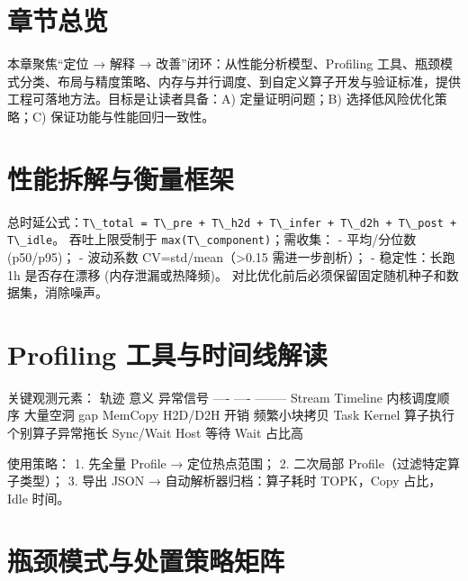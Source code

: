 \section{章节总览}\label{ux7ae0ux8282ux603bux89c8}

本章聚焦``定位 → 解释 → 改善''闭环：从性能分析模型、Profiling
工具、瓶颈模式分类、布局与精度策略、内存与并行调度、到自定义算子开发与验证标准，提供工程可落地方法。目标是让读者具备：A)
定量证明问题；B) 选择低风险优化策略；C) 保证功能与性能回归一致性。

\section{性能拆解与衡量框架}\label{ux6027ux80fdux62c6ux89e3ux4e0eux8861ux91cfux6846ux67b6}

总时延公式：\passthrough{\lstinline!T\_total = T\_pre + T\_h2d + T\_infer + T\_d2h + T\_post + T\_idle!}。
吞吐上限受制于 \passthrough{\lstinline!max(T\_component)!}；需收集： -
平均/分位数 (p50/p95)； - 波动系数 CV=std/mean（\textgreater0.15
需进一步剖析）； - 稳定性：长跑 1h 是否存在漂移 (内存泄漏或热降频)。
对比优化前后必须保留固定随机种子和数据集，消除噪声。

\section{Profiling
工具与时间线解读}\label{profiling-ux5de5ux5177ux4e0eux65f6ux95f4ux7ebfux89e3ux8bfb}

关键观测元素： \textbar{} 轨迹 \textbar{} 意义 \textbar{} 异常信号
\textbar{} \textbar{} ---- \textbar{} ---- \textbar{} --------
\textbar{} \textbar{} Stream Timeline \textbar{} 内核调度顺序 \textbar{}
大量空洞 gap \textbar{} \textbar{} MemCopy \textbar{} H2D/D2H 开销
\textbar{} 频繁小块拷贝 \textbar{} \textbar{} Task Kernel \textbar{}
算子执行 \textbar{} 个别算子异常拖长 \textbar{} \textbar{} Sync/Wait
\textbar{} Host 等待 \textbar{} Wait 占比高 \textbar{}

使用策略： 1. 先全量 Profile → 定位热点范围； 2. 二次局部
Profile（过滤特定算子类型）； 3. 导出 JSON → 自动解析器归档：算子耗时
TOPK，Copy 占比，Idle 时间。

\section{瓶颈模式与处置策略矩阵}\label{ux74f6ux9888ux6a21ux5f0fux4e0eux5904ux7f6eux7b56ux7565ux77e9ux9635}

